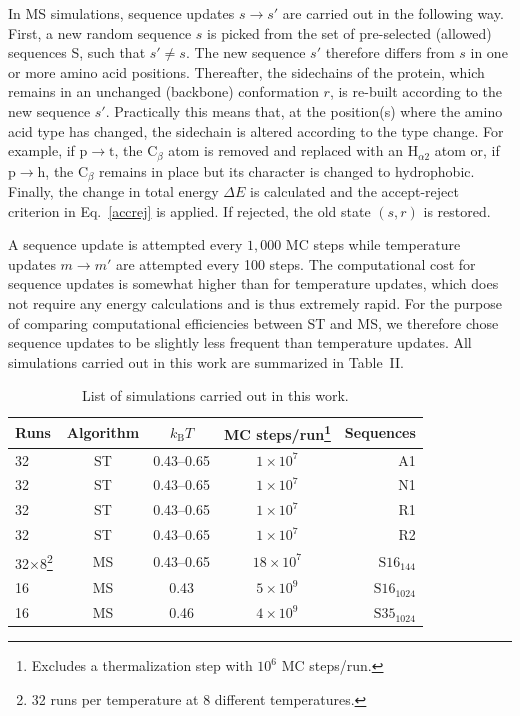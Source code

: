 \documentclass[
aip,
rsi,%
amsmath,amssymb,
reprint,%
]{revtex4-1}
\newcommand	 {\sbar}	{{s}}
\newcommand	 {\rbar}	{{r}}
\newcommand	 {\kb}		{{k_\mathrm{B}}}
\begin{document}
{\color{red}In MS simulations, sequence updates $\sbar\rightarrow\sbar'$ are carried out in the following way. First, a new random sequence $\sbar$ is picked from the set of pre-selected (allowed) sequences S, such that $\sbar'\ne\sbar$. The new sequence $\sbar'$ therefore differs from $\sbar$ in one or more amino acid positions. Thereafter, the sidechains of the protein, which remains in an unchanged (backbone) conformation $\rbar$, is re-built according to the new sequence $\sbar'$. Practically this means that, at the position(s) where the amino acid type has changed, the sidechain is altered according to the type change. For example, if $\mathrm{p}\rightarrow\mathrm{t}$, the $\mathrm{C}_\beta$ atom is removed and replaced with an $\mathrm{H}_{\alpha 2}$ atom or, if $\mathrm{p}\rightarrow\mathrm{h}$, the $\mathrm{C}_\beta$ remains in place but its character is changed to hydrophobic. Finally, the change in total energy $\Delta E$ is calculated and the accept-reject criterion in Eq.~\ref{accrej} is applied. If rejected, the old state $(\sbar,\rbar)$ is restored.} 

A sequence update is attempted every $1,000$ MC steps while temperature updates $m\rightarrow m'$ are attempted every 100 steps. {\color{red}The computational cost for sequence updates is somewhat higher than for temperature updates, which does not require any energy calculations and is thus extremely rapid. For the purpose of comparing computational efficiencies between ST and MS, we therefore chose sequence updates to be slightly less frequent than temperature updates.} All simulations carried out in this work are summarized in Table~II.

\begin{table}
\caption{\label{tab2} List of simulations carried out in this work. }
\begin{ruledtabular}
\begin{tabular}{lcccr}
Runs & Algorithm & $\kb T$  & MC steps/run\footnote{Excludes a thermalization step with $10^6$ MC steps/run.} &  Sequences\\
\hline
32 & ST & 0.43--0.65 & $1\times10^7$ &A1\\ 
32 & ST & 0.43--0.65 & $1\times10^7$ &N1\\ 
32 & ST & 0.43--0.65 & $1\times10^7$ &R1\\ 
32 & ST & 0.43--0.65 & $1\times10^7$ &R2\\ 
32$\times$8\footnote{32 runs per temperature at 8 different temperatures.} & MS &0.43--0.65& $18\times 10^7$ & $\mathrm{S16}_{144}$\\
16 & MS & 0.43  & $5\times 10^9$ &  $\mathrm{S16}_{1024}$ \\
16 & MS & 0.46 & $4\times 10^9$ &  $\mathrm{S35}_{1024}$ \\
\end{tabular}
\end{ruledtabular}
\end{table}
\end{document}
